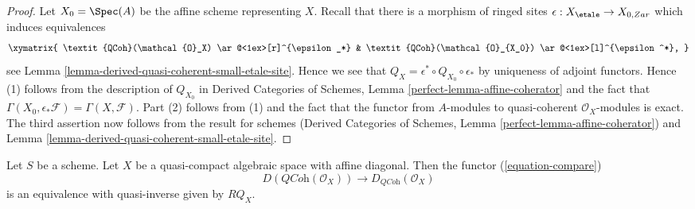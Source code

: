 \begin{proof}
Let $X_0 = \Spec(A)$ be the affine scheme representing $X$.
Recall that there is a morphism of ringed sites
$\epsilon : X_\etale \to X_{0, Zar}$
which induces equivalences
$$
\xymatrix{
\textit{QCoh}(\mathcal{O}_X) \ar@<1ex>[r]^{\epsilon_*} &
\textit{QCoh}(\mathcal{O}_{X_0}) \ar@<1ex>[l]^{\epsilon^*},
}
$$
see Lemma
\ref{lemma-derived-quasi-coherent-small-etale-site}.
Hence we see that $Q_X = \epsilon^* \circ Q_{X_0} \circ \epsilon_*$
by uniqueness of adjoint functors. Hence (1) follows from
the description of $Q_{X_0}$ in
Derived Categories of Schemes, Lemma \ref{perfect-lemma-affine-coherator}
and the fact that
$\Gamma(X_0, \epsilon_*\mathcal{F}) = \Gamma(X, \mathcal{F})$.
Part (2) follows from (1) and the fact that the functor
from $A$-modules to quasi-coherent $\mathcal{O}_X$-modules is exact.
The third assertion now follows from the result for schemes
(Derived Categories of Schemes, Lemma \ref{perfect-lemma-affine-coherator})
and Lemma
\ref{lemma-derived-quasi-coherent-small-etale-site}.
\end{proof}

\begin{proposition}
\label{proposition-quasi-compact-affine-diagonal}
Let $S$ be a scheme. Let $X$ be a quasi-compact algebraic space with affine
diagonal. Then the functor (\ref{equation-compare})
$$
D(\textit{QCoh}(\mathcal{O}_X))
\longrightarrow
D_{\textit{QCoh}}(\mathcal{O}_X)
$$
is an equivalence with quasi-inverse given by $RQ_X$.
\end{proposition}

